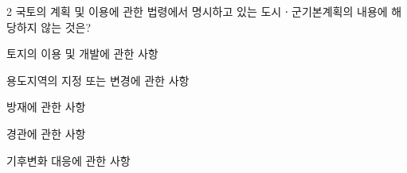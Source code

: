 \begin{question}{2}
국토의 계획 및 이용에 관한 법령에서 명시하고 있는 도시ㆍ군기본계획의 내용에 해당하지 않는 것은?
\begin{choices}
  \item 토지의 이용 및 개발에 관한 사항
  \item 용도지역의 지정 또는 변경에 관한 사항
  \item 방재에 관한 사항
  \item 경관에 관한 사항
  \item 기후변화 대응에 관한 사항
\end{choices}
\end{question}

